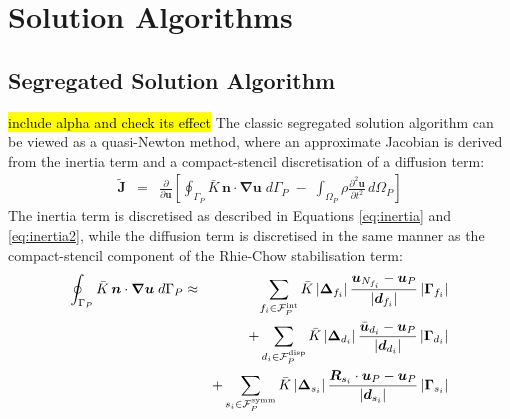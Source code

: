 \documentclass[sn-mathphys,Numbered]{sn-jnl}%
\newcommand{\bb}{\boldsymbol}
\begin{document}
\section{Solution Algorithms}\label{sec:sol_alg}


\subsection{Segregated Solution Algorithm} 
\label{sec:seg_alg}
\hl{include alpha and check its effect}
The classic segregated solution algorithm can be viewed as a quasi-Newton method, where an approximate Jacobian is derived from the inertia term and a compact-stencil discretisation of a diffusion term:
\begin{eqnarray} \label{eq:diffusion}
	\tilde{\bb{J}} &=& \frac{\partial}{\partial \bb{u}} \left[ \oint_{\Gamma_P} \bar{K} \, \bb{n} \cdot \bb{\nabla} \bb{u} \; d\Gamma_P
	 \; -\;  \int_{\Omega_P} \rho \frac{\partial^2 \bb{u} }{\partial t^2} \, d\Omega_P \right]
\end{eqnarray}
The inertia term is discretised as described in Equations \ref{eq:inertia} and \ref{eq:inertia2}, while the diffusion term is discretised in the same manner as the compact-stencil component of the Rhie-Chow stabilisation term:
\begin{eqnarray}
	\oint_{\Gamma_P} \bar{K} \, \bb{n} \cdot \bb{\nabla} \bb{u} \; d\Gamma_P &\approx&
		\sum_{f_i \in \mathcal{F}^{\text{int}}_P}  \bar{K}
		\left|\bb{\Delta}_{f_i} \right| \frac{ \bb{u}_{N_{f_i}} - \bb{u}_P}{\left|\bb{d}_{f_i}\right|}    \left|\bb{\Gamma}_{f_i}\right| \notag \\
	&&+  \sum_{d_i \in \mathcal{F}^{\text{disp}}_P}  \bar{K}
		\left|\bb{\Delta}_{d_i} \right| \frac{ \bar{\bb{u}}_{d_i}  - \bb{u}_P}{\left|\bb{d}_{d_i}\right|} 
		\left|\bb{\Gamma}_{d_i}\right| \notag \\
	&&+ \sum_{s_i \in \mathcal{F}^{\text{symm}}_P}  \bar{K}
		\left|\bb{\Delta}_{s_i} \right| \frac{ \bb{R}_{s_i} \cdot \bb{u}_{P} - \bb{u}_P}{\left|\bb{d}_{s_i}\right|}
		\left|\bb{\Gamma}_{s_i}\right|
\end{eqnarray}
\end{document}
